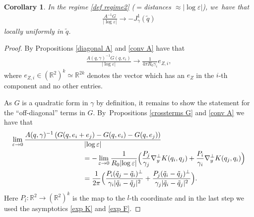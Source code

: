\documentclass[10pt]{amsart}
\let\epsilon\varepsilon
\newtheorem{corollary}[theorem]{Corollary}
\theoremstyle{definition}
\newcommand\R{\mathbb{R}}
\let\eps\epsilon
\let\mel\relax
\begin{document}
\begin{corollary}\label{conv J1}
In the regime \eqref{def regime2} (${}={}$distances $\approx|{\log\eps}|$), we~have that
\begin{align*}
\frac{A^{-1}G}{|{\log\eps}|}\to -J_\gamma^1(\tilde{q})
\end{align*}
locally uniformly in $\tilde{q}$.
\end{corollary}
\begin{proof}
By Propositions \ref{diagonal A} and \ref{conv A} have that
\begin{align*}
\frac{{A(q,\gamma)}^{-1}G(q,e_i)}{|{\log\eps}|}\to \frac{1}{4\pi R_0\gamma_i}e_{Z,i},
\end{align*}
where $e_{Z,i}\in (\R^2)^k\simeq \R^{2k}$ denotes the vector which has an $e_Z$ in the $i$-th component and no other entries.

As $G$ is a quadratic form in $\gamma$ by definition, it remains to show the statement for the ``off-diagonal'' terms in $G$. By~Propositions \ref{crossterms G} and \ref{conv A} we have that
\begin{align*}
\mel\lim_{\eps\to 0}\frac{A(q,\gamma)^{-1}\left(G(q,e_i+e_j)-G(q,e_i)-G(q,e_j)\right)}{|{\log\eps}|}&\\
&\hspace*{-4cm}=- \lim_{\eps\to 0}\frac{1}{R_0|{\log\eps}|} \Bigl(\frac{P_j}{\gamma_j}\nabla_y^\perp K(q_i,q_j)+\frac{P_i}{\gamma_i}\nabla_y^\perp K(q_j,q_i) \Bigr)\\
&\hspace*{-4cm}= \frac{1}{2\pi} \Bigl(\frac{P_i(\tilde{q}_j-\tilde{q}_i)^\perp}{\gamma_i|\tilde{q}_i-\tilde{q}_j|^2}+\frac{P_j(\tilde{q}_i-\tilde{q}_j)^\perp}{\gamma_j|\tilde{q}_i-\tilde{q}_j|^2} \Bigr).
\end{align*}
Here $P_l:\R^2\to (\R^2)^k$ is the map to the $l$-th coordinate and in the last step we used the asymptotics \eqref{exp K} and \eqref{exp F}.
\end{proof}
\end{document}
